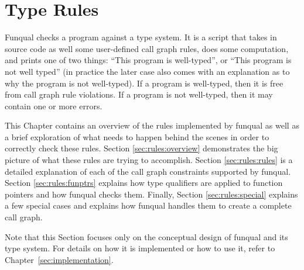 \chapter{Type Rules}\label{sec:rules}

Funqual checks a program against a type system.  It is a script that takes in source code as well some user-defined call graph rules, does some computation, and prints one of two things: ``This program is well-typed'', or ``This program is not well typed'' (in practice the later case also comes with an explanation as to why the program is not well-typed).  If a program is well-typed, then it is free from call graph rule violations.  If a program is not well-typed, then it may contain one or more errors.

This Chapter contains an overview of the rules implemented by funqual as well as a brief exploration of what needs to happen behind the scenes in order to correctly check these rules.  Section \ref{sec:rules:overview} demonstrates the big picture of what these rules are trying to accomplish.  Section \ref{sec:rules:rules} is a detailed explanation of each of the call graph constraints supported by funqual.  Section \ref{sec:rules:funptrs} explains how type qualifiers are applied to function pointers and how funqual checks them.  Finally, Section \ref{sec:rules:special} explains a few special cases and explains how funqual handles them to create a complete call graph.

Note that this Section focuses only on the conceptual design of funqual and its type system.  For details on how it is implemented or how to use it, refer to \mbox{Chapter \ref{sec:implementation}}.








